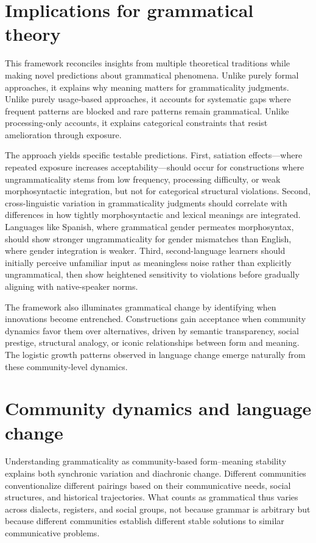 \documentclass[12pt]{article}
\begin{document}
\section{Implications for grammatical theory}

This framework reconciles insights from multiple theoretical traditions while making novel predictions about grammatical phenomena. Unlike purely formal approaches, it explains why meaning matters for grammaticality judgments. Unlike purely usage-based approaches, it accounts for systematic gaps where frequent patterns are blocked and rare patterns remain grammatical. Unlike processing-only accounts, it explains categorical constraints that resist amelioration through exposure.

The approach yields specific testable predictions. First, satiation effects—where repeated exposure increases acceptability—should occur for constructions where ungrammaticality stems from low frequency, processing difficulty, or weak morphosyntactic integration, but not for categorical structural violations. Second, cross-linguistic variation in grammaticality judgments should correlate with differences in how tightly morphosyntactic and lexical meanings are integrated. Languages like Spanish, where grammatical gender permeates morphosyntax, should show stronger ungrammaticality for gender mismatches than English, where gender integration is weaker. Third, second-language learners should initially perceive unfamiliar input as meaningless noise rather than explicitly ungrammatical, then show heightened sensitivity to violations before gradually aligning with native-speaker norms.

The framework also illuminates grammatical change by identifying when innovations become entrenched. Constructions gain acceptance when community dynamics favor them over alternatives, driven by semantic transparency, social prestige, structural analogy, or iconic relationships between form and meaning. The logistic growth patterns observed in language change emerge naturally from these community-level dynamics.

\section{Community dynamics and language change}

Understanding grammaticality as community-based form–meaning stability explains both synchronic variation and diachronic change. Different communities conventionalize different pairings based on their communicative needs, social structures, and historical trajectories. What counts as grammatical thus varies across dialects, registers, and social groups, not because grammar is arbitrary but because different communities establish different stable solutions to similar communicative problems.
\end{document}

